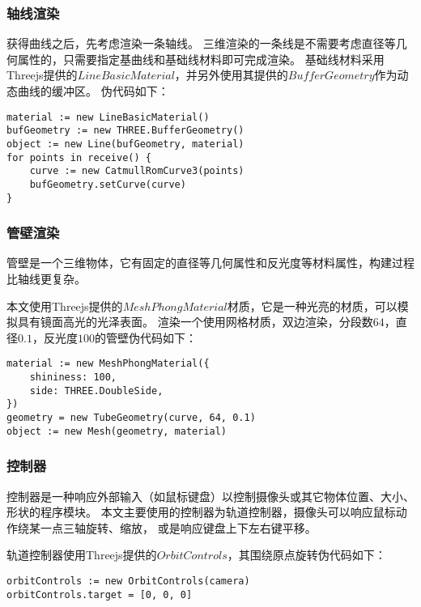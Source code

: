 \subsubsection{轴线渲染}

获得曲线之后，先考虑渲染一条轴线。
三维渲染的一条线是不需要考虑直径等几何属性的，只需要指定基曲线和基础线材料即可完成渲染。
基础线材料采用Threejs提供的$LineBasicMaterial$，并另外使用其提供的$BufferGeometry$作为动态曲线的缓冲区。
伪代码如下：

\begin{lstlisting}[caption={渲染轴线}]
material := new LineBasicMaterial()
bufGeometry := new THREE.BufferGeometry()
object := new Line(bufGeometry, material)
for points in receive() {
    curve := new CatmullRomCurve3(points)
    bufGeometry.setCurve(curve)
}
\end{lstlisting}

\subsubsection{管壁渲染}

管壁是一个三维物体，它有固定的直径等几何属性和反光度等材料属性，构建过程比轴线更复杂。

本文使用Threejs提供的$MeshPhongMaterial$材质，它是一种光亮的材质，可以模拟具有镜面高光的光泽表面。
渲染一个使用网格材质，双边渲染，分段数$64$，直径$0.1$，反光度$100$的管壁伪代码如下：

\begin{lstlisting}[caption={渲染管壁}]
material := new MeshPhongMaterial({
    shininess: 100,
    side: THREE.DoubleSide,
})
geometry = new TubeGeometry(curve, 64, 0.1)
object := new Mesh(geometry, material)
\end{lstlisting}

\subsubsection{控制器}
控制器是一种响应外部输入（如鼠标键盘）以控制摄像头或其它物体位置、大小、形状的程序模块。
本文主要使用的控制器为轨道控制器，摄像头可以响应鼠标动作绕某一点三轴旋转、缩放，
或是响应键盘上下左右键平移。

轨道控制器使用Threejs提供的$OrbitControls$，其围绕原点旋转伪代码如下：

\begin{lstlisting}[caption={轨道控制器}]
orbitControls := new OrbitControls(camera)
orbitControls.target = [0, 0, 0]
\end{lstlisting}

